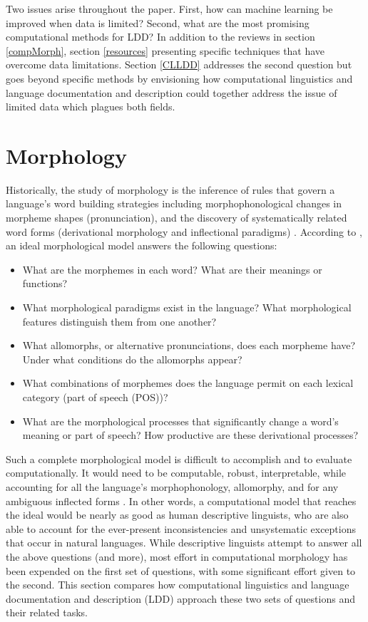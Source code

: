 \documentclass[12pt]{article}
\begin{document}
Two issues arise throughout the paper. First, how can machine learning be improved when data is limited? Second, what are the most promising computational methods for LDD? In addition to the reviews in section \ref{compMorph}, section \ref{resources} presenting specific techniques that have overcome data limitations. Section \ref{CLLDD} addresses the second question but goes beyond specific methods by envisioning how computational linguistics and language documentation and description could together address the issue of limited data which plagues both fields.

\section{Morphology}
\label{tasks}

Historically, the study of morphology is the inference of rules that govern a language’s word building strategies including morphophonological changes in morpheme shapes (pronunciation), and the discovery of systematically related word forms (derivational morphology and inflectional paradigms) \cite{roark_computational_2007}. According to , an ideal morphological model answers the following questions:\begin{singlespace}

\smallskip
\begin{itemize}
    \item What are the morphemes in each word? What are their meanings or functions? 
    \item What morphological paradigms exist in the language? What morphological features distinguish them from one another?
    \item What allomorphs, or alternative pronunciations, does each morpheme have? Under what conditions do the allomorphs appear?  
    \item What combinations of morphemes does the language permit on each lexical category (part of speech (POS))?
    \item What are the morphological processes that significantly change a word's meaning or part of speech? How productive are these derivational processes?
\end{itemize}
\end{singlespace}
\smallskip

Such a complete morphological model is difficult to accomplish and to evaluate computationally. It would need to be computable, robust, interpretable, while accounting for all the language's morphophonology, allomorphy, and for any ambiguous inflected forms \cite{virpioja_empirical_2011}. In other words, a computational model that reaches the ideal would be nearly as good as human descriptive linguists, who are also able to account for the ever-present inconsistencies and unsystematic exceptions that occur in natural languages. While descriptive linguists attempt to answer all the above questions (and more), most effort in computational morphology has been expended on the first set of questions, with some significant effort given to the second. This section compares how computational linguistics and language documentation and description (LDD) approach these two sets of questions and their related tasks.
\end{document}
